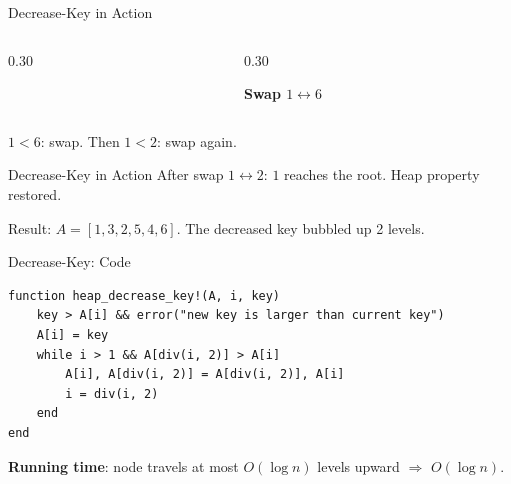 \documentclass[10pt,aspectratio=169]{beamer}
\begin{document}
\begin{frame}{Decrease-Key in Action}
\begin{columns}[c]
\begin{column}{0.30\textwidth}
    \end{column}
    \begin{column}{0.30\textwidth}
      \begin{center}
        \textbf{Swap $1 \leftrightarrow 6$}\\[4pt]
      \end{center}
    \end{column}
  \end{columns}

  \bigskip
  \begin{center}
    $1 < 6$: swap. Then $1 < 2$: swap again.
  \end{center}
\end{frame}

\begin{frame}{Decrease-Key in Action}
  After swap $1 \leftrightarrow 2$: $1$ reaches the root. Heap property restored.

  \bigskip
  \begin{center}
  \end{center}

  \bigskip
  \begin{center}
    Result: $A = [1,3,2,5,4,6]$.
    The decreased key bubbled up 2 levels.
  \end{center}
\end{frame}

\begin{frame}[fragile]{Decrease-Key: Code}
\begin{lstlisting}
function heap_decrease_key!(A, i, key)
    key > A[i] && error("new key is larger than current key")
    A[i] = key
    while i > 1 && A[div(i, 2)] > A[i]
        A[i], A[div(i, 2)] = A[div(i, 2)], A[i]
        i = div(i, 2)
    end
end
\end{lstlisting}

  \textbf{Running time}: node travels at most $O(\log n)$ levels upward $\Rightarrow$ $O(\log n)$.
\end{frame}
\end{document}
